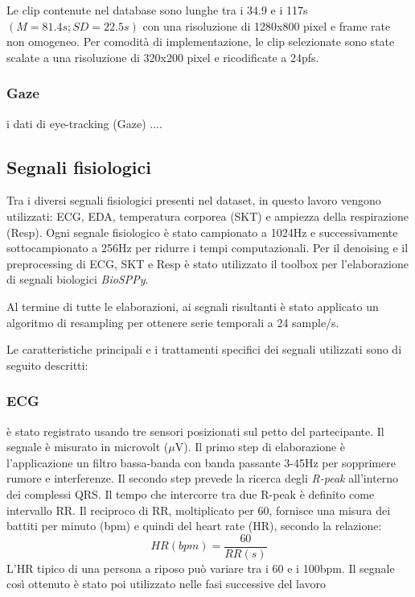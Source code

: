 Le clip contenute nel database sono lunghe tra i 34.9 e i 117s $(M=81.4s; SD=22.5s)$ con una risoluzione di 1280x800 pixel e frame rate non omogeneo. Per comodità di implementazione, le clip selezionate sono state scalate a una risoluzione di 320x200 pixel e ricodificate a 24pfs.

\subsubsection{Gaze}

i dati di eye-tracking (Gaze) ....

\subsection{Segnali fisiologici}

Tra i diversi segnali fisiologici presenti nel dataset, in questo lavoro vengono utilizzati: ECG, EDA, temperatura corporea (SKT) e ampiezza della respirazione (Resp). Ogni segnale fisiologico è stato campionato a 1024Hz e successivamente sottocampionato a 256Hz per ridurre i tempi computazionali. Per il denoising e il preprocessing di ECG, SKT e Resp è stato utilizzato il toolbox per l'elaborazione di segnali biologici \textit{BioSPPy}\cite{carreiras2018biosppy}.

Al termine di tutte le elaborazioni, ai segnali risultanti è stato applicato un algoritmo di resampling per ottenere serie temporali a 24 sample/s.

Le caratteristiche principali e i trattamenti specifici dei segnali utilizzati sono di seguito descritti:

\subsubsection{ECG}
è stato registrato usando tre sensori posizionati sul petto del partecipante. Il segnale è misurato in microvolt ($\mu$V).
Il primo step di elaborazione è l'applicazione un filtro bassa-banda con banda passante 3-45Hz per sopprimere rumore e interferenze.
Il secondo step prevede la ricerca degli \textit{R-peak} all'interno dei complessi QRS. Il tempo che intercorre tra due R-peak è definito come intervallo RR. Il reciproco di RR, moltiplicato per 60, fornisce una misura dei battiti per minuto (bpm) e quindi del heart rate (HR), secondo la relazione:
\begin{equation}
    HR(bpm) = \frac{60}{RR(s)}
\end{equation}
L'HR tipico di una persona a riposo può variare tra i 60 e i 100bpm.
Il segnale così ottenuto è stato poi utilizzato nelle fasi successive del lavoro

